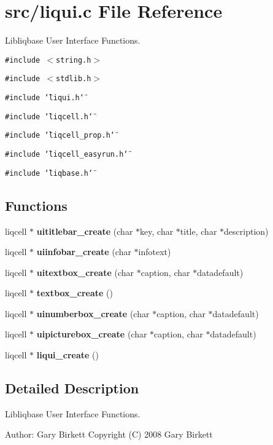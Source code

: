 \section{src/liqui.c File Reference}
\label{de/d77/liqui_8c}
Libliqbase User Interface Functions.  


{\tt \#include $<$string.h$>$}\par
{\tt \#include $<$stdlib.h$>$}\par
{\tt \#include \char`\"{}liqui.h\char`\"{}}\par
{\tt \#include \char`\"{}liqcell.h\char`\"{}}\par
{\tt \#include \char`\"{}liqcell\_\-prop.h\char`\"{}}\par
{\tt \#include \char`\"{}liqcell\_\-easyrun.h\char`\"{}}\par
{\tt \#include \char`\"{}liqbase.h\char`\"{}}\par
\subsection*{Functions}
\begin{CompactItemize}
\item 
liqcell $\ast$ {\bf uititlebar\_\-create} (char $\ast$key, char $\ast$title, char $\ast$description)
\item 
liqcell $\ast$ {\bf uiinfobar\_\-create} (char $\ast$infotext)
\item 
liqcell $\ast$ {\bf uitextbox\_\-create} (char $\ast$caption, char $\ast$datadefault)
\item 
liqcell $\ast$ {\bf textbox\_\-create} ()
\item 
liqcell $\ast$ {\bf uinumberbox\_\-create} (char $\ast$caption, char $\ast$datadefault)
\item 
liqcell $\ast$ {\bf uipicturebox\_\-create} (char $\ast$caption, char $\ast$datadefault)
\item 
liqcell $\ast$ \textbf{liqui\_\-create} ()\label{de/d77/liqui_8c_100082a118d9175656d4dc33d22cb180}

\end{CompactItemize}


\label{_details}
\subsection{Detailed Description}
Libliqbase User Interface Functions. 

\begin{Desc}
\item[Author:]Gary Birkett Copyright (C) 2008 Gary Birkett\end{Desc}
